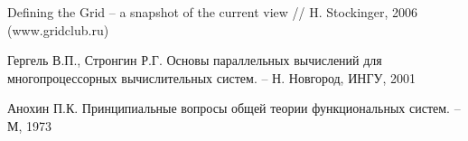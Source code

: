 \documentclass[a4paper,11pt,draft]{article} %
\begin{document}
	\newpage
	\thispagestyle{empty}
	\begin{thebibliography}{99}
		
		Defining the Grid -- a snapshot of the current view // H. Stockinger, 2006 (www.gridclub.ru)
		
		Гергель В.П., Стронгин Р.Г. Основы параллельных вычислений для многопроцессорных вычислительных систем. -- Н. Новгород, ИНГУ, 2001
		
		Анохин П.К. Принципиальные вопросы общей теории функциональных систем. -- М, 1973
		
	\end{thebibliography}
\end{document}
